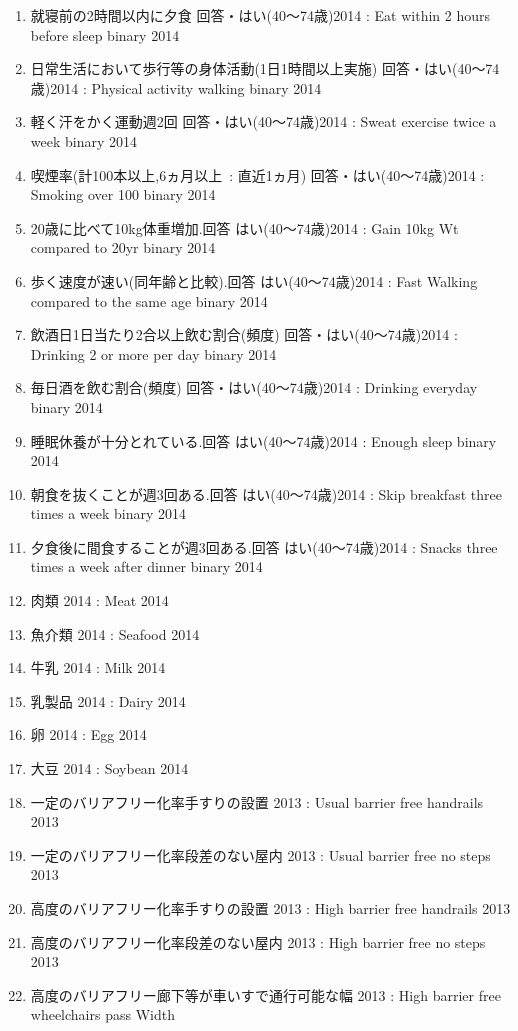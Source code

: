 \begin{enumerate}
  \item 就寝前の2時間以内に夕食 回答・はい(40〜74歳)2014  :  Eat within 2 hours before sleep binary 2014
  \item 日常生活において歩行等の身体活動(1日1時間以上実施) 回答・はい(40〜74歳)2014  :  Physical activity walking binary 2014
  \item 軽く汗をかく運動週2回 回答・はい(40〜74歳)2014  :  Sweat exercise twice a week binary 2014
  \item 喫煙率(計100本以上,6ヵ月以上\ : 直近1ヵ月) 回答・はい(40〜74歳)2014  :  Smoking over 100 binary 2014
  \item 20歳に比べて10kg体重増加.回答 はい(40〜74歳)2014  :  Gain 10kg Wt compared to 20yr binary 2014
  \item 歩く速度が速い(同年齢と比較).回答 はい(40〜74歳)2014  :  Fast Walking compared to the same age binary 2014
  \item 飲酒日1日当たり2合以上飲む割合(頻度) 回答・はい(40〜74歳)2014  :  Drinking 2 or more per day binary 2014
  \item 毎日酒を飲む割合(頻度) 回答・はい(40〜74歳)2014  :  Drinking everyday binary 2014
  \item 睡眠休養が十分とれている.回答 はい(40〜74歳)2014  :  Enough sleep binary 2014
  \item 朝食を抜くことが週3回ある.回答 はい(40〜74歳)2014  :  Skip breakfast three times a week binary 2014
  \item 夕食後に間食することが週3回ある.回答 はい(40〜74歳)2014  :  Snacks three times a week after dinner binary 2014
  \item 肉類 2014  :  Meat 2014
  \item 魚介類 2014  :  Seafood 2014
  \item 牛乳 2014  :  Milk 2014
  \item 乳製品 2014  :  Dairy 2014
  \item 卵 2014  :  Egg 2014
  \item 大豆 2014  :  Soybean 2014
  \item 一定のバリアフリー化率手すりの設置 2013  :  Usual barrier free handrails 2013
  \item 一定のバリアフリー化率段差のない屋内 2013  :  Usual barrier free no steps 2013
  \item 高度のバリアフリー化率手すりの設置 2013  :  High barrier free handrails 2013
  \item 高度のバリアフリー化率段差のない屋内 2013  :  High barrier free no steps 2013
  \item 高度のバリアフリー廊下等が車いすで通行可能な幅 2013  :  High barrier free wheelchairs pass Width

\end{enumerate}
